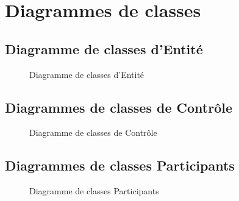 
\section{Diagrammes de classes}
    \subsection{Diagramme de classes d'Entité}
        \FloatBarrier
        \begin{figure}[H]
        \begin{center}
            
        \end{center}
        \caption{Diagramme de classes d'Entité}
        \label{fig:classentity}
        \end{figure}
        \subsection{Diagrammes de classes de Contrôle}
        \FloatBarrier
        \begin{figure}[H]
        \begin{center}
            
        \end{center}
        \caption{Diagramme de classes de Contrôle}
        \label{fig:classcontrol}
        \end{figure}
    \subsection{Diagrammes de classes Participants}
        \FloatBarrier
        \begin{figure}[H]
        \begin{center}
            
        \end{center}
        \caption{Diagramme de classes Participants}
        \label{fig:classpart}
        \end{figure}